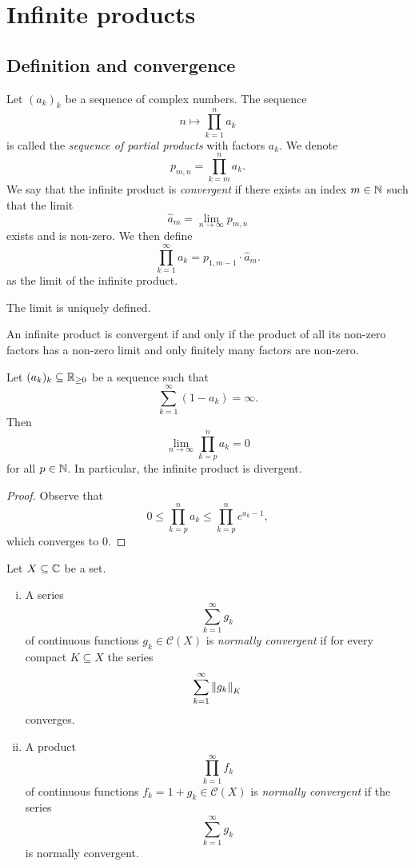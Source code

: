 \section{Infinite products}

\subsection{Definition and convergence}

\begin{definicija}
Let $(a_k)_k$ be a sequence of complex numbers. The sequence
\[
n \mapsto \prod_{k=1}^n a_k
\]
is called the
\emph{sequence of partial products} with
factors $a_k$. We denote
\[
p_{m,n} = \prod_{k=m}^n a_k.
\]
We say that the infinite product is \emph{convergent} if there
exists an index $m \in \mathbb{N}$ such that the limit
\[
\widehat{a}_m = \lim_{n \to \infty} p_{m,n}
\]
exists and is non-zero. We then define
\[
\prod_{k=1}^\infty a_k = p_{1, m-1} \cdot  \widehat{a}_m.
\]
as the limit of the infinite product.
\end{definicija}

\begin{opomba}
The limit is uniquely defined.
\end{opomba}

\begin{opomba}
An infinite product is convergent if and only if the product of all
its non-zero factors has a non-zero limit and only finitely many
factors are non-zero.
\end{opomba}


\begin{lema}
Let $(a_k)_k \subseteq \mathbb{R}_{\geq 0}$ be a sequence such that
\[
\sum_{k=1}^\infty (1 - a_k) = \infty.
\]
Then
\[
\lim_{n \to \infty} \prod_{k=p}^n a_k = 0
\]
for all $p \in \mathbb{N}$. In particular, the infinite product is
divergent.
\end{lema}

\begin{proof}
Observe that
\[
0 \leq
\prod_{k=p}^n a_k \leq
\prod_{k=p}^n e^{a_k - 1},
\]
which converges to $0$.
\end{proof}

\begin{definicija}
Let $X \subseteq \mathbb{C}$ be a set.

\begin{enumerate}[i)]
\item A series
\[
\sum_{k=1}^\infty g_k
\]
of continuous functions $g_k \in \mathcal{C}(X)$ is
\emph{normally convergent} if for every
compact $K \subseteq X$ the series
\[
\sum_{k=1}^\infty \left\lVert g_k\right\rVert_K
\]
converges.

\item A product
\[
\prod_{k=1}^\infty f_k
\]
of continuous functions $f_k = 1 + g_k \in \mathcal{C}(X)$ is
\emph{normally convergent} if the series
\[
\sum_{k=1}^\infty g_k
\]
is normally convergent.
\end{enumerate}
\end{definicija}

